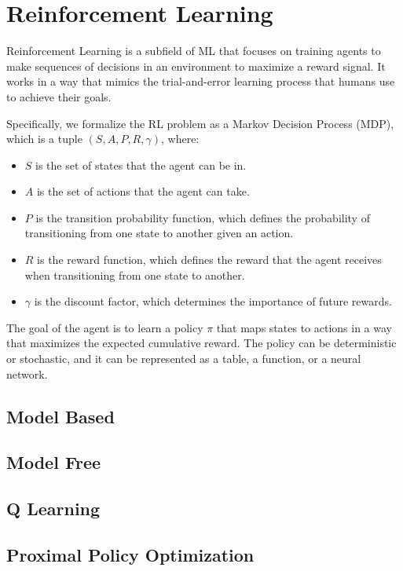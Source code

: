 \section{Reinforcement Learning}
\label{sec:rl}
Reinforcement Learning is a subfield of ML that focuses on training agents to make sequences of decisions in an environment to maximize a reward signal.
It works in a way that mimics the trial-and-error learning process that humans use to achieve their goals.

Specifically, we formalize the RL problem as a Markov Decision Process (MDP), which is a tuple $(S, A, P, R, \gamma)$, where:
\begin{itemize}
    \item $S$ is the set of states that the agent can be in.
    \item $A$ is the set of actions that the agent can take.
    \item $P$ is the transition probability function, which defines the probability of transitioning from one state to another given an action.
    \item $R$ is the reward function, which defines the reward that the agent receives when transitioning from one state to another.
    \item $\gamma$ is the discount factor, which determines the importance of future rewards.
\end{itemize}

The goal of the agent is to learn a policy $\pi$ that maps states to actions in a way that maximizes the expected cumulative reward.
The policy can be deterministic or stochastic, and it can be represented as a table, a function, or a neural network.

\subsection{Model Based}

\subsection{Model Free}

\subsection{Q Learning}

\subsection{Proximal Policy Optimization}









